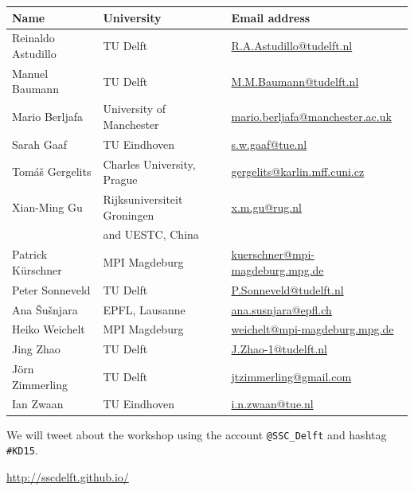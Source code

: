 \documentclass{article}
\begin{document}
\begin{table}[h!]
 \centering
\begin{tabular}{|l|l|l|}
 \hline
\textbf{Name} & \textbf{University} & \textbf{Email address} \\
\hline
Reinaldo Astudillo & TU Delft & \href{mailto:R.A.Astudillo@tudelft.nl}{R.A.Astudillo@tudelft.nl} \\
\hline
Manuel Baumann & TU Delft & \href{mailto:M.M.Baumann@tudelft.nl}{M.M.Baumann@tudelft.nl} \\
\hline
Mario Berljafa & University of Manchester & \href{mailto:mario.berljafa@manchester.ac.uk}{mario.berljafa@manchester.ac.uk} \\
\hline
Sarah Gaaf & TU Eindhoven & \href{mailto:s.w.gaaf@tue.nl}{s.w.gaaf@tue.nl} \\
\hline
Tom{\'a}{\v s} Gergelits & Charles University, Prague & \href{mailto:gergelits@karlin.mff.cuni.cz}{gergelits@karlin.mff.cuni.cz} \\
\hline
Xian-Ming Gu & Rijksuniversiteit Groningen  & \href{mailto:x.m.gu@rug.nl}{x.m.gu@rug.nl} \\
&and UESTC, China & \\
\hline
Patrick K\"{u}rschner & MPI Magdeburg & \href{mailto:kuerschner@mpi-magdeburg.mpg.de}{kuerschner@mpi-magdeburg.mpg.de} \\
\hline
Peter Sonneveld & TU Delft &\href{mailto:P.Sonneveld@tudelft.nl}{P.Sonneveld@tudelft.nl} \\
\hline
Ana {\v S}u{\v s}njara & EPFL, Lausanne & \href{mailto:ana.susnjara@epfl.ch}{ana.susnjara@epfl.ch} \\
\hline
Heiko Weichelt & MPI Magdeburg & \href{mailto:weichelt@mpi-magdeburg.mpg.de}{weichelt@mpi-magdeburg.mpg.de}\\
\hline
Jing Zhao & TU Delft & \href{mailto:J.Zhao-1@tudelft.nl}{J.Zhao-1@tudelft.nl} \\
\hline
J\"orn Zimmerling & TU Delft &\href{mailto:jtzimmerling@gmail.com}{jtzimmerling@gmail.com} \\
\hline
Ian Zwaan & TU Eindhoven &\href{mailto:i.n.zwaan@tue.nl}{i.n.zwaan@tue.nl} \\
\hline
\end{tabular}
\end{table}

\bigskip
We will tweet about the workshop using the account \texttt{@SSC\_Delft} and hashtag \texttt{\#KD15}.

\vfill

\begin{center}
 \href{http://sscdelft.github.io/}{http://sscdelft.github.io/}
\end{center}
\end{document}
